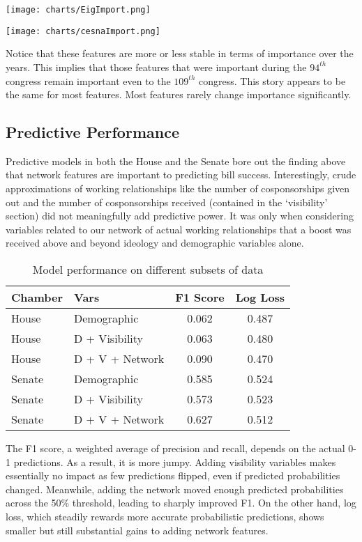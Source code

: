 \texttt{[image: charts/EigImport.png]}

\texttt{[image: charts/cesnaImport.png]}

Notice that these features are more or less stable in terms of importance over
the years. This implies that those features that were important during the
$94^{th}$ congress remain important even to the $109^{th}$ congress. This story
appears to be the same for most features. Most features rarely change importance
significantly.

\subsection{Predictive Performance}

Predictive models in both the House and the Senate bore out the finding above that network features are important to predicting bill success. Interestingly, crude approximations of working relationships like the number of cosponsorships given out and the number of cosponsorships received (contained in the `visibility' section) did not meaningfully add predictive power. It was only when considering variables related to our network of actual working relationships that a boost was received above and beyond ideology and demographic variables alone.

\begin{table}
\centering
   \begin{tabular}{llcc}
   \toprule
   Chamber & Vars & F1 Score & Log Loss \\ \midrule
   House & Demographic & 0.062 & 0.487 \\
   House & D + Visibility & 0.063 & 0.480 \\
   House & D + V + Network & 0.090 & 0.470 \\
   Senate & Demographic & 0.585 & 0.524 \\
   Senate & D + Visibility & 0.573 & 0.523 \\ 
   Senate & D + V + Network & 0.627 & 0.512 \\ \bottomrule
   \end{tabular}
   \caption{Model performance on different subsets of data}
   \label{table:perf}
\end{table}

The F1 score, a weighted average of precision and recall, depends on the actual 0-1 predictions. As a result, it is more jumpy. Adding visibility variables makes essentially no impact as few predictions flipped, even if predicted probabilities changed. Meanwhile, adding the network moved enough predicted probabilities across the 50\% threshold, leading to sharply improved F1. On the other hand, log loss, which steadily rewards more accurate probabilistic predictions, shows smaller but still substantial gains to adding network features.

